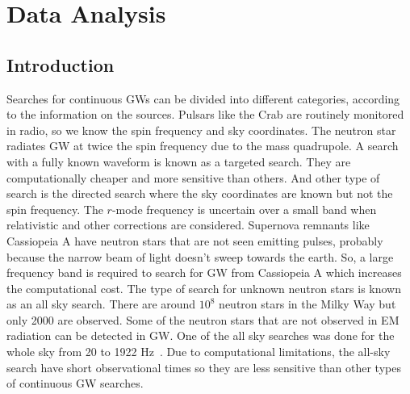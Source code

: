 \documentclass{ttuthes2007}
\begin{document}

\chapter{\textbf{Data Analysis}}
\section{Introduction}
Searches for continuous \acp{GW} can be divided into different categories,
according to the information on the sources. Pulsars like the Crab are routinely
monitored in radio, so we know the spin frequency and sky coordinates. The
neutron star radiates \ac{GW} at twice the spin frequency due to the mass
quadrupole. A search with a fully known waveform is known as a targeted search.
They are computationally cheaper and more sensitive than others. And other type
of search is the directed search where the sky coordinates are known but not the
spin frequency. The $r$-mode frequency is uncertain over a small band when
relativistic and other corrections are considered. Supernova remnants like
Cassiopeia A have neutron stars that are not seen emitting pulses, probably
because the narrow beam of light doesn't sweep towards the earth. So, a large
frequency band is required to search for \ac{GW} from Cassiopeia A which
increases the computational cost. The type of search for unknown neutron stars
is known as an all sky search. There are around $10^8$ neutron stars in the
Milky Way but only 2000 are observed. Some of the neutron stars that are not
observed in \ac{EM} radiation can be detected in \ac{GW}. One of the all sky
searches was done for the whole sky from 20 to 1922 Hz~\cite{Abbott_2019a}. Due
to computational limitations, the all-sky search have short observational times
so they are less sensitive than other types of continuous \ac{GW} searches.
\end{document}
